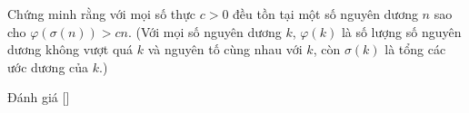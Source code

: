 \ifshowproblem
\begin{problem}\label{problem:HUN-2015-TST-KMA-635}
    Chứng minh rằng với mọi số thực $c > 0$ đều tồn tại một số nguyên dương $n$ sao cho $\varphi(\sigma(n)) > cn$.  
    (Với mọi số nguyên dương $k$, $\varphi(k)$ là số lượng số nguyên dương không vượt quá $k$ và nguyên tố cùng nhau với $k$,
    còn $\sigma(k)$ là tổng các ước dương của $k$.)
\end{problem}
\fi

\ifshowinfo
Đánh giá [\textbf{}]
\fi
